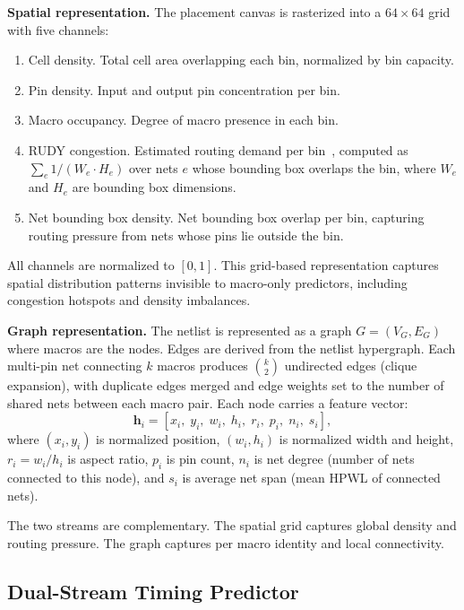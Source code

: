\documentclass[sigconf,anonymous,review,9pt]{acmart}
\begin{document}
\textbf{Spatial representation.} The placement canvas is rasterized into
a $64 \times 64$ grid with five channels:
\begin{enumerate}
    \item Cell density. Total cell area overlapping each bin,
    normalized by bin capacity.
    \item Pin density. Input and output pin concentration per bin.
    \item Macro occupancy. Degree of macro presence in each bin.
    \item RUDY congestion. Estimated routing demand per
    bin~\cite{rudy}, computed as $\sum_{e} 1/(W_e \cdot H_e)$ over
    nets $e$ whose bounding box overlaps the bin, where $W_e$ and $H_e$
    are bounding box dimensions.
    \item Net bounding box density. Net bounding box overlap
    per bin, capturing routing pressure from nets whose
    pins lie outside the bin.
\end{enumerate}
All channels are normalized to $[0, 1]$. This grid-based representation
captures spatial distribution patterns invisible to macro-only
predictors, including congestion hotspots and density imbalances.

\textbf{Graph representation.} The netlist is represented as a graph
$G = (V_G, E_G)$ where macros are the nodes. Edges are derived
from the netlist hypergraph. Each multi-pin net connecting $k$ macros
produces $\binom{k}{2}$ undirected edges (clique expansion), with
duplicate edges merged and edge weights set to the number of shared
nets between each macro pair. Each node carries
a feature vector:
\begin{equation}
\label{eq:node_features}
\mathbf{h}_i = [x_i,\; y_i,\; w_i,\; h_i,\; r_i,\; p_i,\;
n_i,\; s_i],
\end{equation}
where $(x_i, y_i)$ is normalized position, $(w_i, h_i)$ is normalized
width and height, $r_i = w_i / h_i$ is aspect ratio, $p_i$ is pin
count, $n_i$ is net degree (number of nets connected to this node), and
$s_i$ is average net span (mean HPWL of connected nets). 

The two streams are complementary. The spatial grid captures global
density and routing pressure. The graph captures per macro identity and
local connectivity.

\subsection{Dual-Stream Timing Predictor}
\label{subsec:architecture}
\end{document}
